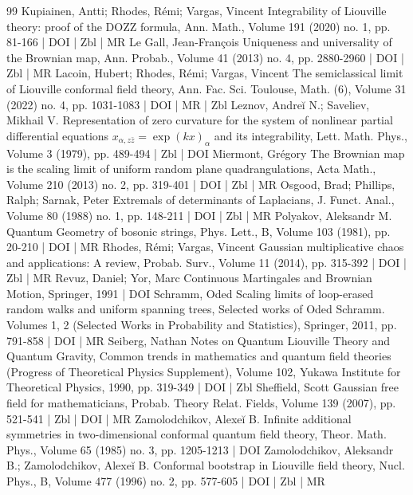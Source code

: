 \begin{thebibliography}{99}
Kupiainen, Antti; Rhodes, Rémi; Vargas, Vincent Integrability of Liouville theory: proof of the DOZZ formula, Ann. Math., Volume 191 (2020) no. 1, pp. 81-166 | DOI | Zbl | MR
Le Gall, Jean-François Uniqueness and universality of the Brownian map, Ann. Probab., Volume 41 (2013) no. 4, pp. 2880-2960 | DOI | Zbl | MR
Lacoin, Hubert; Rhodes, Rémi; Vargas, Vincent The semiclassical limit of Liouville conformal field theory, Ann. Fac. Sci. Toulouse, Math. (6), Volume 31 (2022) no. 4, pp. 1031-1083 | DOI | MR | Zbl
Leznov, Andreĭ N.; Saveliev, Mikhail V. Representation of zero curvature for the system of nonlinear partial differential equations $x_{\alpha ,z\bar{z}}=\exp (kx)_\alpha $ and its integrability, Lett. Math. Phys., Volume 3 (1979), pp. 489-494 | Zbl | DOI
Miermont, Grégory The Brownian map is the scaling limit of uniform random plane quadrangulations, Acta Math., Volume 210 (2013) no. 2, pp. 319-401 | DOI | Zbl | MR
Osgood, Brad; Phillips, Ralph; Sarnak, Peter Extremals of determinants of Laplacians, J. Funct. Anal., Volume 80 (1988) no. 1, pp. 148-211 | DOI | Zbl | MR
Polyakov, Aleksandr M. Quantum Geometry of bosonic strings, Phys. Lett., B, Volume 103 (1981), pp. 20-210 | DOI | MR
Rhodes, Rémi; Vargas, Vincent Gaussian multiplicative chaos and applications: A review, Probab. Surv., Volume 11 (2014), pp. 315-392 | DOI | Zbl | MR
Revuz, Daniel; Yor, Marc Continuous Martingales and Brownian Motion, Springer, 1991 | DOI
Schramm, Oded Scaling limits of loop-erased random walks and uniform spanning trees, Selected works of Oded Schramm. Volumes 1, 2 (Selected Works in Probability and Statistics), Springer, 2011, pp. 791-858 | DOI | MR
Seiberg, Nathan Notes on Quantum Liouville Theory and Quantum Gravity, Common trends in mathematics and quantum field theories (Progress of Theoretical Physics Supplement), Volume 102, Yukawa Institute for Theoretical Physics, 1990, pp. 319-349 | DOI | Zbl
Sheffield, Scott Gaussian free field for mathematicians, Probab. Theory Relat. Fields, Volume 139 (2007), pp. 521-541 | Zbl | DOI | MR
Zamolodchikov, Alexeĭ B. Infinite additional symmetries in two-dimensional conformal quantum field theory, Theor. Math. Phys., Volume 65 (1985) no. 3, pp. 1205-1213 | DOI
Zamolodchikov, Aleksandr B.; Zamolodchikov, Alexeĭ B. Conformal bootstrap in Liouville field theory, Nucl. Phys., B, Volume 477 (1996) no. 2, pp. 577-605 | DOI | Zbl | MR
\end{thebibliography}
